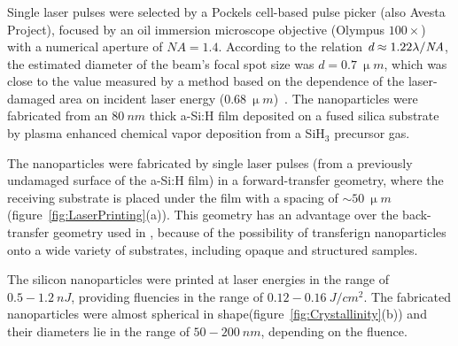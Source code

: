         \subsubsection{}
            Single laser pulses were selected by a Pockels cell-based pulse picker (also Avesta Project),
            focused by an oil immersion microscope objective (Olympus $100\times$)
            with a numerical aperture of $\mathit{NA}=1.4$. According to the relation $\emph{d}\approx 1.22\lambda/\mathit{NA}$, the estimated
            diameter of the beam's focal spot size was $d=0.7~\si{\upmu m}$, which was close to the value measured by a method based on
            the dependence of the laser-damaged area on incident laser energy ($0.68~\si{\upmu m}$)~\cite{liu1982simple}.
            The nanoparticles were fabricated from an $80~\si{nm}$ thick a-Si:H film deposited on a fused silica substrate by
            plasma enhanced chemical vapor deposition from a SiH$_{3}$ precursor gas.

                The nanoparticles were fabricated by single laser pulses (from a previously undamaged surface of the a-Si:H film) in a
            forward-transfer geometry, where the receiving substrate is placed under the film with a spacing
            of $\sim 50~\si{\upmu m}$ (figure~\ref{fig:LaserPrinting}(a)). This geometry has an advantage over the back-transfer geometry
            used in \cite{zywietz2014laser}, because of the possibility of transferign nanoparticles onto a wide variety of substrates,
            including opaque and structured samples.

                The silicon nanoparticles were printed at laser energies in the range of $0.5-1.2~\si{nJ}$, providing fluencies in
            the range of $0.12-0.16~\si{J/cm^{2}}$. The fabricated nanoparticles were almost spherical in shape(figure~\ref{fig:Crystallinity}(b))
            and their diameters lie in the range of $50-200~\si{nm}$, depending on the fluence.

